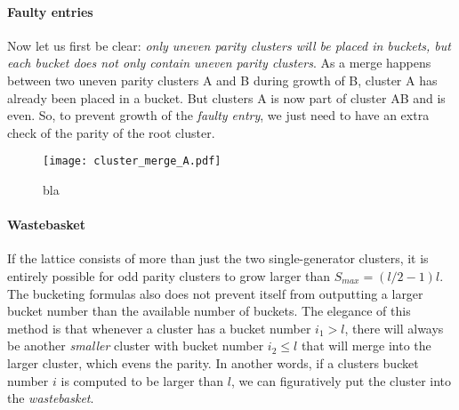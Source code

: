 \paragraph{Faulty entries}
Now let us first be clear: \emph{only uneven parity clusters will be placed in buckets, but each bucket does not only contain uneven parity clusters}. As a merge happens between two uneven parity clusters A and B during growth of B, cluster A has already been placed in a bucket. But clusters A is now part of cluster AB and is even. So, to prevent growth of the \emph{faulty entry}, we just need to have an extra check of the parity of the root cluster.

\begin{figure}
  \centering
  \texttt{[image: cluster\_merge\_A.pdf]}
  \caption{bla}\label{3.fig.clustermergeA}
\end{figure}

\paragraph{Wastebasket}
If the lattice consists of more than just the two single-generator clusters, it is entirely possible for odd parity clusters to grow larger than $S_{max} = (l/2-1)l$. The bucketing formulas also does not prevent itself from outputting a larger bucket number than the available number of buckets. The elegance of this method is that whenever a cluster has a bucket number $i_1>l$, there will always be another \emph{smaller} cluster with bucket number $i_2\leq l$ that will merge into the larger cluster, which evens the parity. In another words, if a clusters bucket number $i$ is computed to be larger than $l$, we can figuratively put the cluster into the \emph{wastebasket}.

